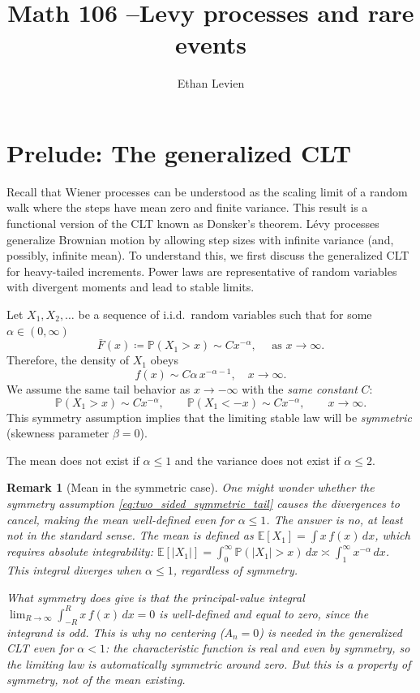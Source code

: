 \documentclass[11pt]{article}
\title{Math 106 --Levy processes and rare events }
\author{Ethan Levien}
\date{}
\newtheorem{remark}{Remark}
\begin{document}
\maketitle


\section{Prelude: The generalized CLT}\label{sec:genclt}

Recall that Wiener processes can be understood as the scaling limit of a random walk where the steps have mean zero and finite variance. This result is a functional version of the CLT known as Donsker's theorem. 
L\'evy processes generalize Brownian motion by allowing step sizes with infinite variance (and, possibly, infinite mean). To understand this, we first discuss the generalized CLT for heavy-tailed increments. Power laws are representative of random variables with divergent moments and lead to stable limits.

Let $X_1,X_2,\dots$ be a sequence of i.i.d.\ random variables such that for some $\alpha \in (0,\infty)$
\begin{equation}\label{eq:tail_powerlaw}
\bar{F}(x) \coloneqq {\mathbb P}(X_1>x) \sim C x^{-\alpha},\quad \text{ as } x \to \infty.
\end{equation}
Therefore, the density of $X_1$ obeys 
\begin{equation}\label{eq:density_powerlaw}
f(x) \sim C\alpha\, x^{-\alpha-1},\quad x \to \infty.
\end{equation}
We assume the same tail behavior as $x\to -\infty$ with the \emph{same constant} $C$:
\begin{equation}\label{eq:two_sided_symmetric_tail}
{\mathbb P}(X_1>x)\sim C x^{-\alpha},
\qquad
{\mathbb P}(X_1<-x)\sim C x^{-\alpha},
\qquad x\to\infty.
\end{equation}
This symmetry assumption implies that the limiting stable law will be \emph{symmetric} (skewness parameter $\beta=0$). 

The mean does not exist if $\alpha\le 1$ and the variance does not exist if $\alpha\le 2$.

\begin{remark}[Mean in the symmetric case]
One might wonder whether the symmetry assumption \eqref{eq:two_sided_symmetric_tail} causes the divergences to cancel, making the mean well-defined even for $\alpha\le 1$. The answer is no, at least not in the standard sense. The mean is defined as ${\mathbb E}[X_1]=\int x\,f(x)\,dx$, which requires \emph{absolute} integrability: ${\mathbb E}[|X_1|]=\int_{0}^{\infty}{\mathbb P}(|X_1|>x)\,dx\asymp \int_1^\infty x^{-\alpha}\,dx$. This integral diverges when $\alpha\le 1$, regardless of symmetry.

What symmetry \emph{does} give is that the \emph{principal-value} integral $\lim_{R\to\infty}\int_{-R}^{R}x\,f(x)\,dx=0$ is well-defined and equal to zero, since the integrand is odd. This is why no centering ($A_n=0$) is needed in the generalized CLT even for $\alpha<1$: the characteristic function is real and even by symmetry, so the limiting law is automatically symmetric around zero. But this is a property of symmetry, not of the mean existing.
\end{remark}
\end{document}
